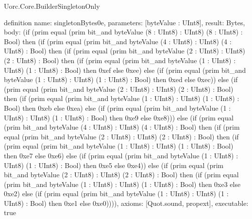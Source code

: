 \begin{lexlean}{Uorc.Core.BuilderSingletonOnly}
\begin{semanticmodule}
definition{
  name: singletonBytes0e,
  parameters: [byteValue : UInt8],
  result: Bytes,
  body: (if (prim equal (prim bit_and byteValue (8 : UInt8) : UInt8) (8 : UInt8) : Bool) then (if (prim equal (prim bit_and byteValue (4 : UInt8) : UInt8) (4 : UInt8) : Bool) then (if (prim equal (prim bit_and byteValue (2 : UInt8) : UInt8) (2 : UInt8) : Bool) then (if (prim equal (prim bit_and byteValue (1 : UInt8) : UInt8) (1 : UInt8) : Bool) then 0xef else 0xee) else (if (prim equal (prim bit_and byteValue (1 : UInt8) : UInt8) (1 : UInt8) : Bool) then 0xed else 0xec)) else (if (prim equal (prim bit_and byteValue (2 : UInt8) : UInt8) (2 : UInt8) : Bool) then (if (prim equal (prim bit_and byteValue (1 : UInt8) : UInt8) (1 : UInt8) : Bool) then 0xeb else 0xea) else (if (prim equal (prim bit_and byteValue (1 : UInt8) : UInt8) (1 : UInt8) : Bool) then 0xe9 else 0xe8))) else (if (prim equal (prim bit_and byteValue (4 : UInt8) : UInt8) (4 : UInt8) : Bool) then (if (prim equal (prim bit_and byteValue (2 : UInt8) : UInt8) (2 : UInt8) : Bool) then (if (prim equal (prim bit_and byteValue (1 : UInt8) : UInt8) (1 : UInt8) : Bool) then 0xe7 else 0xe6) else (if (prim equal (prim bit_and byteValue (1 : UInt8) : UInt8) (1 : UInt8) : Bool) then 0xe5 else 0xe4)) else (if (prim equal (prim bit_and byteValue (2 : UInt8) : UInt8) (2 : UInt8) : Bool) then (if (prim equal (prim bit_and byteValue (1 : UInt8) : UInt8) (1 : UInt8) : Bool) then 0xe3 else 0xe2) else (if (prim equal (prim bit_and byteValue (1 : UInt8) : UInt8) (1 : UInt8) : Bool) then 0xe1 else 0xe0)))),
  axioms: [Quot.sound, propext],
  executable: true
}


\end{semanticmodule}
\end{lexlean}
